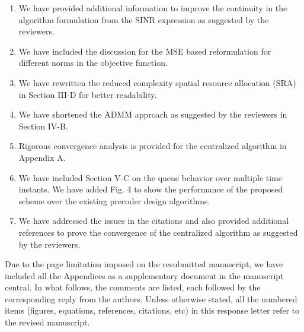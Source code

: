 \begin{enumerate}
\item We have provided additional information to improve the continuity in the algorithm formulation from the SINR expression as suggested by the reviewers.
\item We have included the discussion for the MSE based reformulation for different norms in the objective function.
\item We have rewritten the reduced complexity spatial resource allocation (SRA) in Section III-D for better readability.
\item We have shortened the ADMM approach as suggested by the reviewers in Section IV-B.
\item Rigorous convergence analysis is provided for the centralized algorithm in Appendix A.
\item We have included Section V-C on the queue behavior over multiple time instants. We have added Fig. 4 to show the performance of the proposed scheme over the existing precoder design algorithms.
\item We have addressed the issues in the citations and also provided additional references to prove the convergence of the centralized algorithm as suggested by the reviewers.
\end{enumerate}

Due to the page limitation imposed on the resubmitted manuscript, we have included all the Appendices as a supplementary document in the manuscript central. In what follows, the comments are listed, each followed by the corresponding reply from the authors. Unless otherwise stated, all the numbered items (figures, equations, references, citations, etc) in this response letter refer to the revised manuscript.